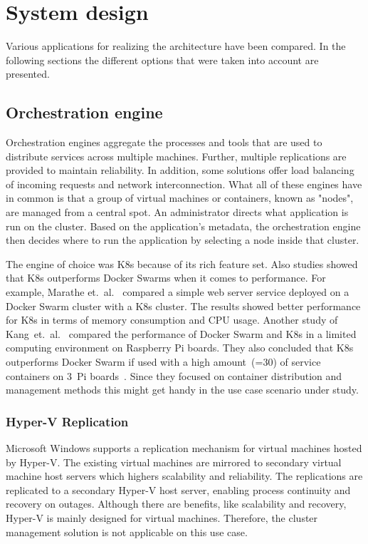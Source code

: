\chapter{System design} %

\label{chap:design} %

Various applications for realizing the architecture have been compared. In the following sections the different options that were taken into account are presented.

\section{Orchestration engine}
Orchestration engines aggregate the processes and tools that are used to distribute services across multiple machines. Further, multiple replications are provided to maintain reliability. In addition, some solutions offer load balancing of incoming requests and network interconnection.
What all of these engines have in common is that a group of virtual machines or containers, known as "nodes", are managed from a central spot. An administrator directs what application is run on the cluster. Based on the application's metadata, the orchestration engine then decides where to run the application by selecting a node inside that cluster.

The engine of choice was \ac{K8s} because of its rich feature set.
Also studies showed that \ac{K8s} outperforms Docker Swarms when it comes to performance. For example, Marathe et.~al.~\cite{Marathe.2019} compared a simple web server service deployed on a Docker Swarm cluster with a \ac{K8s} cluster. The results showed better performance for \ac{K8s} in terms of memory consumption and CPU usage. Another study of Kang~et.~al.~\cite{Kang.2021} compared the performance of Docker Swarm and \ac{K8s} in a limited computing environment on Raspberry Pi boards. They also concluded that \ac{K8s} outperforms Docker Swarm if used with a high amount~(=30) of service containers on 3~Pi boards~\cite{Kang.2021}. Since they focused on container distribution and management methods this might get handy in the use case scenario under study.

\subsection{Hyper-V Replication} Microsoft \ac{Windows} supports a replication mechanism for virtual machines hosted by Hyper-V. The existing virtual machines are mirrored to secondary virtual machine host servers which highers scalability and reliability. The replications are replicated to a secondary Hyper-V host server, enabling process continuity and recovery on outages.
Although there are benefits, like scalability and recovery, Hyper-V is mainly designed for virtual machines. Therefore, the cluster management solution is not applicable on this use case.

